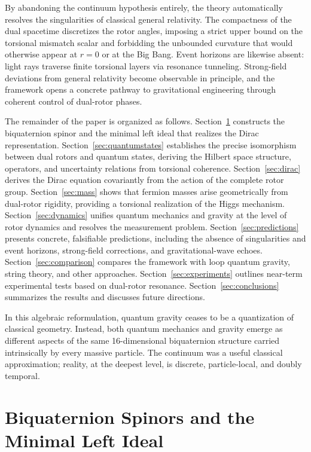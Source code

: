 \documentclass[dvipdfmx,11pt,a4paper]{article}
\begin{document}
By abandoning the continuum hypothesis entirely, the theory automatically resolves the singularities of classical general relativity. The compactness of the dual spacetime discretizes the rotor angles, imposing a strict upper bound on the torsional mismatch scalar and forbidding the unbounded curvature that would otherwise appear at $r=0$ or at the Big Bang. Event horizons are likewise absent: light rays traverse finite torsional layers via resonance tunneling. Strong-field deviations from general relativity become observable in principle, and the framework opens a concrete pathway to gravitational engineering through coherent control of dual-rotor phases.

The remainder of the paper is organized as follows. Section~\ref{sec:spinor} constructs the biquaternion spinor and the minimal left ideal that realizes the Dirac representation. Section~\ref{sec:quantumstates} establishes the precise isomorphism between dual rotors and quantum states, deriving the Hilbert space structure, operators, and uncertainty relations from torsional coherence. Section~\ref{sec:dirac} derives the Dirac equation covariantly from the action of the complete rotor group. Section~\ref{sec:mass} shows that fermion masses arise geometrically from dual-rotor rigidity, providing a torsional realization of the Higgs mechanism. Section~\ref{sec:dynamics} unifies quantum mechanics and gravity at the level of rotor dynamics and resolves the measurement problem. Section~\ref{sec:predictions} presents concrete, falsifiable predictions, including the absence of singularities and event horizons, strong-field corrections, and gravitational-wave echoes. Section~\ref{sec:comparison} compares the framework with loop quantum gravity, string theory, and other approaches. Section~\ref{sec:experiments} outlines near-term experimental tests based on dual-rotor resonance. Section~\ref{sec:conclusions} summarizes the results and discusses future directions.

In this algebraic reformulation, quantum gravity ceases to be a quantization of classical geometry. Instead, both quantum mechanics and gravity emerge as different aspects of the same 16-dimensional biquaternion structure carried intrinsically by every massive particle. The continuum was a useful classical approximation; reality, at the deepest level, is discrete, particle-local, and doubly temporal.

\section{Biquaternion Spinors and the Minimal Left Ideal}
\label{sec:spinor}
\end{document}
